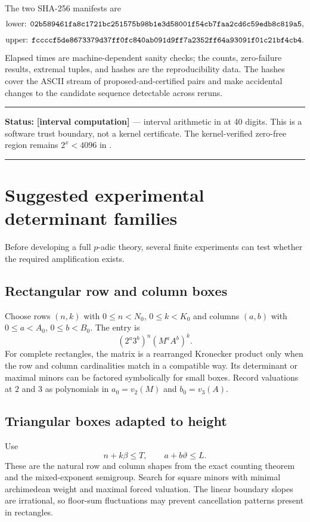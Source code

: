 \documentclass[11pt,oneside]{article}
\theoremstyle{definition}
\theoremstyle{remark}
\newcommand{\thetaq}{\vartheta}
\newcommand{\vpp}[2]{v_{#1}\!\left(#2\right)}
\newcommand{\sha}[1]{\texttt{\detokenize{#1}}}
\newcommand{\lean}[1]{\texttt{\detokenize{#1}}}
\newcommand{\statuscomp}{\textcolor{computeviolet}{\textbf{[interval computation]}}}
\newenvironment{statusbox}[1]
{\begin{center}\begin{minipage}{0.94\textwidth}\raggedright\hbadness=10000\hrule
\vspace{0.45em}\textbf{Status:} #1\par\vspace{0.35em}}
{\vspace{0.35em}\hrule\end{minipage}\end{center}}
\begin{document}
The two SHA-256 manifests are
\[
\text{lower: }\sha{02b589461fa8c1721bc251575b98b1e3d58001f54cb7faa2cd6c59edb8c819a5},
\]
\[
\text{upper: }\sha{fccccf5de8673379d37ff0fc840ab091d9ff7a2352ff64a93091f01c21bf4cb4}.
\]
Elapsed times are machine-dependent sanity checks; the counts, zero-failure results, extremal
tuples, and hashes are the reproducibility data.  The hashes cover the ASCII stream
\lean{m:n;} of proposed-and-certified pairs and make accidental changes to the candidate
sequence detectable across reruns.

\begin{statusbox}{\statuscomp{} --- interval arithmetic in \lean{mpmath} \cite{mpmath} at 40
digits.  This is a software trust boundary, not a kernel certificate.  The kernel-verified
zero-free region remains $2^x<4096$ in \lean{FiniteCheck4096}.}
\end{statusbox}

\section{Suggested experimental determinant families}
\label{app:experiments}

Before developing a full $p$-adic theory, several finite experiments can test whether the
required amplification exists.

\subsection{Rectangular row and column boxes}

Choose rows $(n,k)$ with $0\le n<N_0$, $0\le k<K_0$ and columns $(a,b)$ with
$0\le a<A_0$, $0\le b<B_0$.  The entry is
\[
 (2^a3^b)^n(M^aA^b)^k.
\]
For complete rectangles, the matrix is a rearranged Kronecker product only when the row and
column cardinalities match in a compatible way.  Its determinant or maximal minors can be
factored symbolically for small boxes.  Record valuations at $2$ and $3$ as polynomials in
$a_0=\vpp{2}{M}$ and $b_0=\vpp{3}{A}$.

\subsection{Triangular boxes adapted to height}

Use
\[
 n+k\beta\le T,
 \qquad
 a+b\thetaq\le L.
\]
These are the natural row and column shapes from the exact counting theorem and the
mixed-exponent semigroup.  Search for square minors with minimal archimedean weight and
maximal forced valuation.  The linear boundary slopes are irrational, so floor-sum
fluctuations may prevent cancellation patterns present in rectangles.
\end{document}
